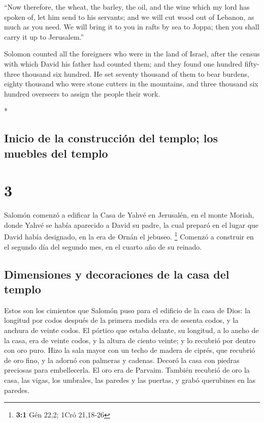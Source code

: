 \begin{paracol}{2}
\begin{otherlanguage}{english}
 ``Now therefore, the wheat, the barley, the oil, and the
wine which my lord has spoken of, let him send to his servants;
 and we will cut wood out of Lebanon, as much as you
need. We will bring it to you in rafts by sea to Joppa; then you shall
carry it up to Jerusalem.''

 Solomon counted all the foreigners who were in the land
of Israel, after the census with which David his father had counted
them; and they found one hundred fifty-three thousand six hundred.
 He set seventy thousand of them to bear burdens, eighty
thousand who were stone cutters in the mountains, and three thousand six
hundred overseers to assign the people their work.

\end{otherlanguage}

\switchcolumn[0]*

\hypertarget{inicio-de-la-construcciuxf3n-del-templo-los-muebles-del-templo}{%
\subsection{Inicio de la construcción del templo; los muebles del
templo}\label{inicio-de-la-construcciuxf3n-del-templo-los-muebles-del-templo}}

\hypertarget{section-4}{%
\section{3}\label{section-4}}

 Salomón comenzó a edificar la Casa de Yahvé en Jerusalén,
en el monte Moriah, donde Yahvé se había aparecido a David su padre, la
cual preparó en el lugar que David había designado, en la era de Ornán
el jebuseo. \footnote{\textbf{3:1} Gén 22,2; 1Cró 21,18-26}
 Comenzó a construir en el segundo día del segundo mes, en
el cuarto año de su reinado.

\hypertarget{dimensiones-y-decoraciones-de-la-casa-del-templo}{%
\subsection{Dimensiones y decoraciones de la casa del
templo}\label{dimensiones-y-decoraciones-de-la-casa-del-templo}}

 Estos son los cimientos que Salomón puso para el edificio
de la casa de Dios: la longitud por codos después de la primera medida
era de sesenta codos, y la anchura de veinte codos.  El
pórtico que estaba delante, su longitud, a lo ancho de la casa, era de
veinte codos, y la altura de ciento veinte; y lo recubrió por dentro con
oro puro.  Hizo la sala mayor con un techo de madera de
ciprés, que recubrió de oro fino, y la adornó con palmeras y cadenas.
 Decoró la casa con piedras preciosas para embellecerla.
El oro era de Parvaim.  También recubrió de oro la casa,
las vigas, los umbrales, las paredes y las puertas, y grabó querubines
en las paredes.


\end{paracol}
